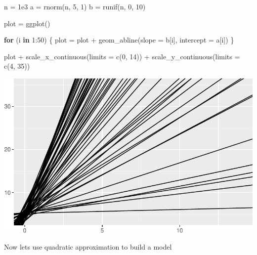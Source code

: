 \documentclass[
  letterpaper,
  DIV=11,
  numbers=noendperiod]{scrartcl}
\newenvironment{Shaded}{\begin{snugshade}}{\end{snugshade}}
\newcommand{\AttributeTok}[1]{\textcolor[rgb]{0.40,0.45,0.13}{#1}}
\newcommand{\ControlFlowTok}[1]{\textcolor[rgb]{0.00,0.23,0.31}{\textbf{#1}}}
\newcommand{\DecValTok}[1]{\textcolor[rgb]{0.68,0.00,0.00}{#1}}
\newcommand{\FloatTok}[1]{\textcolor[rgb]{0.68,0.00,0.00}{#1}}
\newcommand{\FunctionTok}[1]{\textcolor[rgb]{0.28,0.35,0.67}{#1}}
\newcommand{\NormalTok}[1]{\textcolor[rgb]{0.00,0.23,0.31}{#1}}
\newcommand{\OtherTok}[1]{\textcolor[rgb]{0.00,0.23,0.31}{#1}}
\newcommand{\SpecialCharTok}[1]{\textcolor[rgb]{0.37,0.37,0.37}{#1}}
\begin{document}
\begin{Shaded}
\begin{Highlighting}[]
\NormalTok{n }\OtherTok{=} \FloatTok{1e3}
\NormalTok{a }\OtherTok{=} \FunctionTok{rnorm}\NormalTok{(n, }\DecValTok{5}\NormalTok{, }\DecValTok{1}\NormalTok{)}
\NormalTok{b }\OtherTok{=} \FunctionTok{runif}\NormalTok{(n, }\DecValTok{0}\NormalTok{, }\DecValTok{10}\NormalTok{)}

\NormalTok{plot }\OtherTok{=} \FunctionTok{ggplot}\NormalTok{()}

\ControlFlowTok{for}\NormalTok{ (i }\ControlFlowTok{in} \DecValTok{1}\SpecialCharTok{:}\DecValTok{50}\NormalTok{) \{}
\NormalTok{    plot }\OtherTok{=}\NormalTok{ plot }\SpecialCharTok{+} \FunctionTok{geom\_abline}\NormalTok{(}\AttributeTok{slope =}\NormalTok{ b[i], }\AttributeTok{intercept =}\NormalTok{ a[i])}
\NormalTok{\}}

\NormalTok{plot }\SpecialCharTok{+} 
    \FunctionTok{scale\_x\_continuous}\NormalTok{(}\AttributeTok{limits =} \FunctionTok{c}\NormalTok{(}\DecValTok{0}\NormalTok{, }\DecValTok{14}\NormalTok{)) }\SpecialCharTok{+} 
    \FunctionTok{scale\_y\_continuous}\NormalTok{(}\AttributeTok{limits =} \FunctionTok{c}\NormalTok{(}\DecValTok{4}\NormalTok{, }\DecValTok{35}\NormalTok{))}
\end{Highlighting}
\end{Shaded}

\includegraphics{week-2-homework_files/figure-pdf/unnamed-chunk-8-1.pdf}

Now lets use quadratic approximation to build a model
\end{document}
